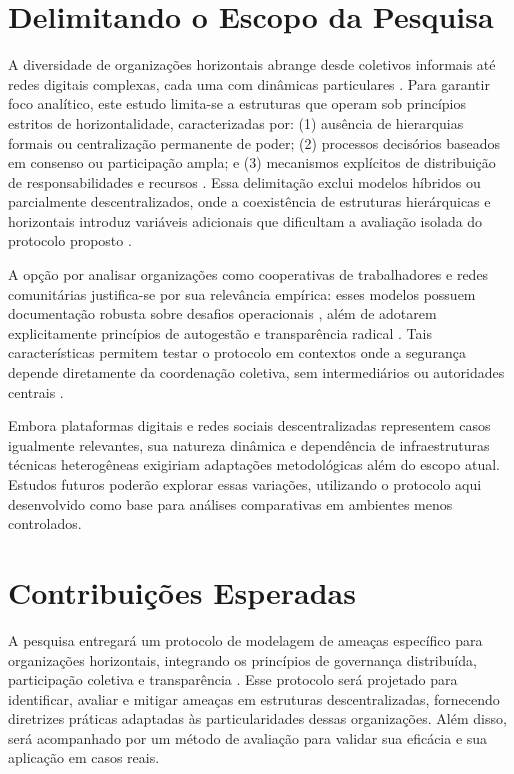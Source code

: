 \section{Delimitando o Escopo da Pesquisa}
\label{sec:delimitacao_escopo}

A diversidade de organizações horizontais abrange desde coletivos informais até
redes digitais complexas, cada uma com dinâmicas particulares \cite{EverydayRevolutions}. Para garantir
foco analítico, este estudo limita-se a estruturas que operam sob princípios
estritos de horizontalidade, caracterizadas por: (1) ausência de hierarquias
formais ou centralização permanente de poder; (2) processos decisórios baseados
em consenso ou participação ampla; e (3) mecanismos explícitos de distribuição
de responsabilidades e recursos \cite{Colbac}. Essa delimitação exclui modelos
híbridos ou parcialmente descentralizados, onde a coexistência de estruturas
hierárquicas e horizontais introduz variáveis adicionais que dificultam a
avaliação isolada do protocolo proposto \cite{Non-HierarchicalForms}.

A opção por analisar organizações como cooperativas de trabalhadores e redes
comunitárias justifica-se por sua relevância empírica: esses modelos possuem
documentação robusta sobre desafios operacionais
\cite{WorkerCooperativesinAmerica}, além de adotarem explicitamente princípios
de autogestão e transparência radical \cite{EverydayRevolutions}. Tais
características permitem testar o protocolo em contextos onde a segurança
depende diretamente da coordenação coletiva, sem intermediários ou autoridades
centrais \cite{ThreatModelingdesigningForSecurity}.

Embora plataformas digitais e redes sociais descentralizadas
\cite{CreatingTheCollectiveSocialMedia} representem casos igualmente relevantes,
sua natureza dinâmica e dependência de infraestruturas técnicas heterogêneas
exigiriam adaptações metodológicas além do escopo atual. Estudos futuros poderão
explorar essas variações, utilizando o protocolo aqui desenvolvido como base
para análises comparativas em ambientes menos controlados.


\section{Contribuições Esperadas} 
\label{sec:contribuicoes_esperadas}

A pesquisa entregará um protocolo de modelagem de ameaças específico para
organizações horizontais, integrando os princípios de governança distribuída,
participação coletiva e transparência \cite{Colbac}. Esse protocolo será projetado para
identificar, avaliar e mitigar ameaças em estruturas descentralizadas,
fornecendo diretrizes práticas adaptadas às particularidades dessas
organizações. Além disso, será acompanhado por um método de avaliação para
validar sua eficácia e sua aplicação em casos reais.

